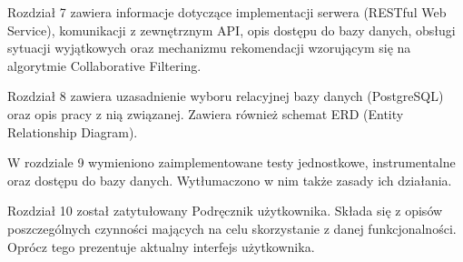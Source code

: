 \par Rozdział 7 zawiera informacje dotyczące implementacji serwera (RESTful Web Service), komunikacji z zewnętrznym API, opis dostępu do bazy danych, obsługi sytuacji wyjątkowych oraz mechanizmu rekomendacji wzorującym się na algorytmie Collaborative Filtering.

\par Rozdział 8 zawiera uzasadnienie wyboru relacyjnej bazy danych (PostgreSQL) oraz opis pracy z nią związanej. Zawiera również schemat ERD (Entity Relationship Diagram).

\par W rozdziale 9 wymieniono zaimplementowane testy jednostkowe, instrumentalne oraz dostępu do bazy danych. Wytłumaczono w nim także zasady ich działania.

\par Rozdział 10 został zatytułowany Podręcznik użytkownika. Składa się z opisów poszczególnych czynności mających na celu skorzystanie z danej funkcjonalności. Oprócz tego prezentuje aktualny interfejs użytkownika.
